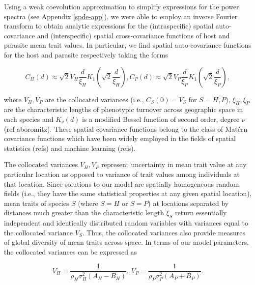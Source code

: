 \documentclass{article}
\begin{document}
Using a weak coevolution approximation to simplify expressions for the
power spectra (see Appendix \ref{spde-app}), we were able to employ an
inverse Fourier transform to obtain analytic expressions for the
(intraspecific) spatial auto-covariance and (interspecific) spatial
cross-covariance functions of host and parasite mean trait values. In
particular, we find spatial auto-covariance functions for the host and
parasite respectively taking the forms

\begin{subequations}
  \begin{equation}
    C_H(d)\approx\sqrt2V_H\frac{d}{\xi_H}K_1\left(\sqrt2\frac{d}{\xi_H}\right),
  \end{equation}
  \begin{equation}
    C_P(d)\approx\sqrt2V_P\frac{d}{\xi_P}K_1\left(\sqrt2\frac{d}{\xi_P}\right),
  \end{equation}
\end{subequations}

where \(V_H,V_P\) are the collocated variances (i.e., \(C_S(0)=V_S\) for
\(S=H,P\)), \(\xi_H,\xi_P\) are the characteristic lengths of phenotypic
turnover across geographic space in each species and \(K_\nu(d)\) is a
modified Bessel function of second order, degree \(\nu\) (ref
aboromitz). These spatial covariance functions belong to the class of
Matérn covariance functions which have been widely employed in the
fields of spatial statistics (refs) and machine learning (refs).

The collocated variances \(V_H,V_P\) represent uncertainty in mean trait
value at any particular location as opposed to variance of trait values
among individuals at that location. Since solutions to our model are
spatially homogeneous random fields (i.e., they have the same
statistical properties at any given spatial location), mean traits of
species \(S\) (where \(S=H\) or \(S=P\)) at locations separated by
distances much greater than the characteristic length \(\xi_S\) return
essentially independent and identically distributed random variables
with variances equal to the collocated variance \(V_S\). Thus, the
collocated variances also provide measures of global diversity of mean
traits across space. In terms of our model parameters, the collocated
variances can be expressed as

\begin{equation}\label{coll-vars}
  V_H = \frac{1}{\rho_H\sigma_H^2(A_H-B_H)}, \ V_P = \frac{1}{\rho_P\sigma_P^2(A_P+B_P)}.
\end{equation}
\end{document}
